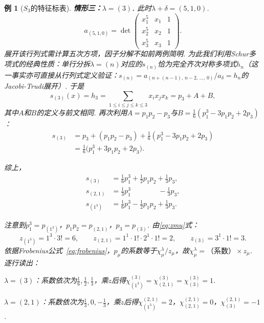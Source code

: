 \documentclass{sjtureport}
\newtheorem{example}{例}[chapter]
\begin{document}
\begin{example}[$S_3$的特征标表]
\medskip
\noindent\textbf{情形三：$\lambda=(3)$. }\quad
此时$\lambda+\delta=(5,1,0)$. 
\begin{equation*}
    a_{(5,1,0)}=\det\begin{pmatrix}
        x_1^5 & x_1 & 1\\
        x_2^5 & x_2 & 1\\
        x_3^5 & x_3 & 1
    \end{pmatrix}.
\end{equation*}
展开该行列式需计算五次方项，因子分解不如前两例简明. 为此我们利用Schur多项式的经典性质：单行分拆$\lambda=(n)$对应的$s_{(n)}$恰为完全齐次对称多项式$h_n$（这一事实亦可直接从行列式定义验证：$s_{(n)}=a_{(n+(n-1),\,n-2,\,\dots,\,0)}/a_\delta=h_n$的Jacobi-Trudi展开）. 于是
\begin{equation*}
    s_{(3)}(x)=h_3=\sum_{1\le i\le j\le k\le 3} x_i x_j x_k
    =p_3+A+B,
\end{equation*}
其中$A$和$B$的定义与前文相同. 再次利用$A=p_1p_2-p_3$与$B=\frac{1}{6}(p_1^3-3p_1p_2+2p_3)$：
\begin{align*}
    s_{(3)}&=p_3+(p_1p_2-p_3)+\frac{1}{6}(p_1^3-3p_1p_2+2p_3)\\
    &=\frac{1}{6}\bigl(p_1^3+3p_1p_2+2p_3\bigr).
\end{align*}

综上，
\begin{align}
    s_{(3)}     &= \frac{1}{6}p_1^3 + \frac{1}{2}p_1p_2 + \frac{1}{3}p_3,\label{eq:S3-s3-ps}\\
    s_{(2,1)}   &= \frac{1}{3}p_1^3 \mathbin{\phantom{+}} \mathbin{\phantom{+p_1p_2}} - \frac{1}{3}p_3,\\
    s_{(1^3)}   &= \frac{1}{6}p_1^3 - \frac{1}{2}p_1p_2 + \frac{1}{3}p_3.
\end{align}

注意到$p_1^3=p_{(1^3)}$，$p_1p_2=p_{(2,1)}$，$p_3=p_{(3)}$. 由\eqref{eq:zmu}式：
\begin{equation*}
    z_{(1^3)} = 1^3\cdot 3! = 6,\qquad
    z_{(2,1)} = 1^1\cdot 1! \cdot 2^1\cdot 1! = 2,\qquad
    z_{(3)}   = 3^1\cdot 1! = 3.
\end{equation*}
依据Frobenius公式~\eqref{eq:frobenius}，$p_\mu$的系数等于$\chi^\lambda_\mu/z_\mu$，故$\chi^\lambda_\mu=\text{（系数）}\times z_\mu$. 逐行读出：

\medskip
\noindent$\lambda=(3)$：系数依次为$\frac{1}{6},\frac{1}{2},\frac{1}{3}$，乘$z$后得$\chi^{(3)}_{(1^3)}=\chi^{(3)}_{(2,1)}=\chi^{(3)}_{(3)}=1$. 

\medskip
\noindent$\lambda=(2,1)$：系数依次为$\frac{1}{3},0,-\frac{1}{3}$，乘$z$后得$\chi^{(2,1)}_{(1^3)}=2$，$\chi^{(2,1)}_{(2,1)}=0$，$\chi^{(2,1)}_{(3)}=-1$. 


\end{example}
\end{document}
